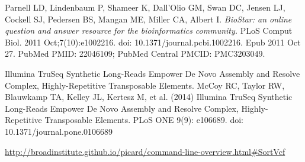 \documentclass{article}
\begin{document}
\begin{thebibliography}{9}
Parnell LD, Lindenbaum P, Shameer K, Dall'Olio GM, Swan DC, Jensen LJ, Cockell SJ, Pedersen BS, Mangan ME, Miller CA, Albert I.
\emph{BioStar: an online question and answer resource for the bioinformatics community.} PLoS Comput Biol. 2011
Oct;7(10):e1002216. doi: 10.1371/journal.pcbi.1002216. Epub 2011 Oct 27. PubMed
PMID: 22046109; PubMed Central PMCID: PMC3203049.

Illumina TruSeq Synthetic Long-Reads Empower De Novo Assembly and Resolve Complex, Highly-Repetitive Transposable Elements.
McCoy RC, Taylor RW, Blauwkamp TA, Kelley JL, Kertesz M, et al. (2014) Illumina TruSeq Synthetic Long-Reads Empower De Novo Assembly and Resolve Complex, Highly-Repetitive Transposable Elements. PLoS ONE 9(9): e106689. doi: 10.1371/journal.pone.0106689 

\url{http://broadinstitute.github.io/picard/command-line-overview.html#SortVcf}

\end{thebibliography}
\end{document}
